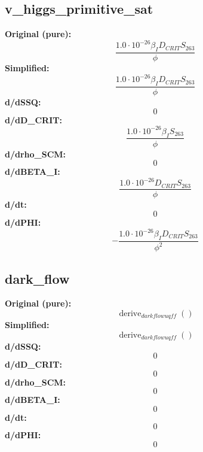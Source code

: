\subsection{v_higgs_primitive_sat}
\textbf{Original (pure):}
\begin{equation}
\frac{1.0 \cdot 10^{-26} \beta_{I} D_{CRIT} S_{26 3}}{\phi}
\end{equation}
\textbf{Simplified:}
\begin{equation}
\frac{1.0 \cdot 10^{-26} \beta_{I} D_{CRIT} S_{26 3}}{\phi}
\end{equation}
\textbf{d/dSSQ:}
\begin{equation}
0
\end{equation}
\textbf{d/dD_CRIT:}
\begin{equation}
\frac{1.0 \cdot 10^{-26} \beta_{I} S_{26 3}}{\phi}
\end{equation}
\textbf{d/drho_SCM:}
\begin{equation}
0
\end{equation}
\textbf{d/dBETA_I:}
\begin{equation}
\frac{1.0 \cdot 10^{-26} D_{CRIT} S_{26 3}}{\phi}
\end{equation}
\textbf{d/dt:}
\begin{equation}
0
\end{equation}
\textbf{d/dPHI:}
\begin{equation}
- \frac{1.0 \cdot 10^{-26} \beta_{I} D_{CRIT} S_{26 3}}{\phi^{2}}
\end{equation}

\subsection{dark_flow}
\textbf{Original (pure):}
\begin{equation}
\operatorname{derive}_{dark flow uqff}{\left( \right)}
\end{equation}
\textbf{Simplified:}
\begin{equation}
\operatorname{derive}_{dark flow uqff}{\left( \right)}
\end{equation}
\textbf{d/dSSQ:}
\begin{equation}
0
\end{equation}
\textbf{d/dD_CRIT:}
\begin{equation}
0
\end{equation}
\textbf{d/drho_SCM:}
\begin{equation}
0
\end{equation}
\textbf{d/dBETA_I:}
\begin{equation}
0
\end{equation}
\textbf{d/dt:}
\begin{equation}
0
\end{equation}
\textbf{d/dPHI:}
\begin{equation}
0
\end{equation}

